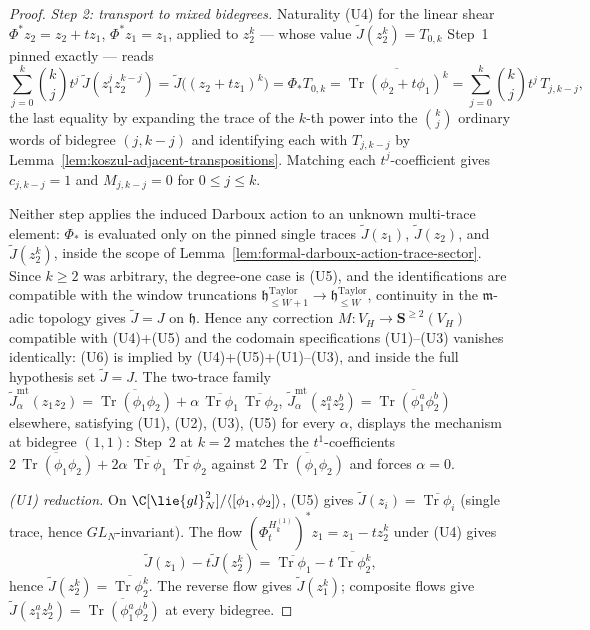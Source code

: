 \documentclass[11pt]{memoir}
\begin{document}
\begin{proof}
  \emph{Step 2: transport to mixed bidegrees.}  Naturality (U4) for
  the linear shear \(\Phi^*z_2=z_2+tz_1\), \(\Phi^*z_1=z_1\), applied
  to \(z_2^k\) --- whose value \(\widetilde J(z_2^k)=T_{0,k}\) Step~1
  pinned exactly --- reads
  \[
    \sum_{j=0}^k\binom{k}{j}t^j\,\widetilde J(z_1^jz_2^{k-j})
    =\widetilde J\bigl((z_2+tz_1)^k\bigr)
    =\Phi_*T_{0,k}
    =\overline{\operatorname{Tr}(\phi_2+t\phi_1)^k}
    =\sum_{j=0}^k\binom{k}{j}t^j\,T_{j,k-j},
  \]
  the last equality by expanding the trace of the \(k\)-th power into
  the \(\binom{k}{j}\) ordinary words of bidegree \((j,k-j)\) and
  identifying each with \(T_{j,k-j}\) by
  Lemma~\ref{lem:koszul-adjacent-transpositions}.  Matching each
  \(t^j\)-coefficient gives \(c_{j,k-j}=1\) and \(M_{j,k-j}=0\) for
  \(0\leq j\leq k\).

  Neither step applies the induced Darboux action to an unknown
  multi-trace element: \(\Phi_*\) is evaluated only on the pinned
  single traces \(\widetilde J(z_1)\), \(\widetilde J(z_2)\), and
  \(\widetilde J(z_2^k)\), inside the scope of
  Lemma~\ref{lem:formal-darboux-action-trace-sector}.  Since
  \(k\geq2\) was arbitrary, the degree-one case is (U5), and the
  identifications are compatible with the window truncations
  \(\mathfrak h^{\mathrm{Taylor}}_{\leq W+1}\to
  \mathfrak h^{\mathrm{Taylor}}_{\leq W}\), continuity in the
  \(\mathfrak m\)-adic topology gives \(\widetilde J=J\) on
  \(\mathfrak h\).  Hence any correction
  \(M\colon V_H\to\mathbf S^{\ge2}(V_H)\) compatible with (U4)+(U5)
  and the codomain specifications (U1)--(U3) vanishes identically:
  (U6) is implied by (U4)+(U5)+(U1)--(U3), and inside the full
  hypothesis set \(\widetilde J=J\).  The two-trace family
  \(\widetilde J^{\mathrm{mt}}_\alpha(z_1z_2)
   =\overline{\operatorname{Tr}(\phi_1\phi_2)}
     +\alpha\,\overline{\operatorname{Tr}\phi_1}\,
      \overline{\operatorname{Tr}\phi_2}\),
  \(\widetilde J^{\mathrm{mt}}_\alpha(z_1^az_2^b)
   =\overline{\operatorname{Tr}(\phi_1^a\phi_2^b)}\) elsewhere,
  satisfying (U1), (U2), (U3), (U5) for every \(\alpha\), displays the
  mechanism at bidegree \((1,1)\): Step~2 at \(k=2\) matches the
  \(t^1\)-coefficients
  \(2\,\overline{\operatorname{Tr}(\phi_1\phi_2)}
   +2\alpha\,\overline{\operatorname{Tr}\phi_1}\,
    \overline{\operatorname{Tr}\phi_2}\) against
  \(2\,\overline{\operatorname{Tr}(\phi_1\phi_2)}\) and forces
  \(\alpha=0\).

  \emph{(U1) reduction.}  On
  \(\C[\lie{gl}_N^2]/\langle[\phi_1,\phi_2]\rangle\), (U5) gives
  \(\widetilde J(z_i)=\overline{\operatorname{Tr}\phi_i}\) (single
  trace, hence \(GL_N\)-invariant).  The flow
  \((\Phi_t^{H_k^{(1)}})^*z_1=z_1-tz_2^k\) under (U4) gives
  \[
    \widetilde J(z_1)-t\widetilde J(z_2^k)
     =\overline{\operatorname{Tr}\phi_1}-t\overline{\operatorname{Tr}\phi_2^k},
  \]
  hence \(\widetilde J(z_2^k)=\overline{\operatorname{Tr}\phi_2^k}\).
  The reverse flow gives \(\widetilde J(z_1^k)\); composite flows
  give
  \(\widetilde J(z_1^az_2^b)=\overline{\operatorname{Tr}(\phi_1^a\phi_2^b)}\)
  at every bidegree.


\end{proof}
\end{document}
